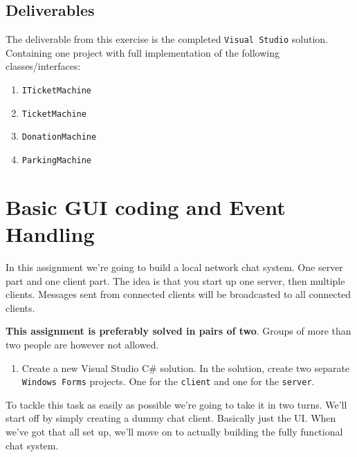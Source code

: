 \documentclass{article}
\newcounter{stepcounter}
\newenvironment{steps}{ 
  \begin{enumerate}[label=\color{red}Step \theenumi)]
    \setcounter{enumi}{\value{stepcounter}}
}{
  \setcounter{stepcounter}{\value{enumi}}
  \end{enumerate}
}
\begin{document}
\subsection{Deliverables}
The deliverable from this exercise is the completed \texttt{Visual Studio} solution. Containing one project with full implementation of the following classes/interfaces:
\begin{enumerate}
  \item \texttt{ITicketMachine}
  \item \texttt{TicketMachine}
  \item \texttt{DonationMachine}
  \item \texttt{ParkingMachine}
\end{enumerate}














\pagebreak
\section{Basic GUI coding and Event Handling}
In this assignment we're going to build a local network chat system. One server part and one client part. The idea is that you start up one server, then multiple clients. Messages sent from connected clients will be broadcasted to all connected clients.

\textbf{This assignment is preferably solved in pairs of two}. Groups of more than two people are however not allowed.
\begin{steps}
\item Create a new Visual Studio C\# solution. In the solution, create two separate \texttt{Windows Forms} projects. One for the \texttt{client} and one for the \texttt{server}.
\end{steps}
To tackle this task as easily as possible we're going to take it in two turns. We'll start off by simply creating a dummy chat client. Basically just the UI. When we've got that all set up, we'll move on to actually building the fully functional chat system.
\end{document}
